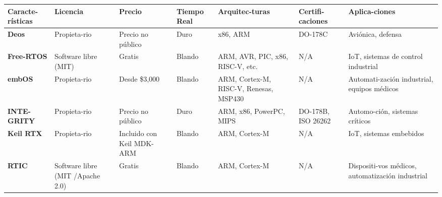 \begin{table}[]
\centering
\renewcommand{\arraystretch}{1.5}
\begin{tabularx}{\textwidth}{|X|X|X|X|X|X|X|}
\hline
\textbf{Caracte-rísticas}	&  \textbf{Licencia}						& \textbf{Precio}		 &  \textbf{Tiempo Real}	& \textbf{Arquitec-turas}			& \textbf{Certifi-caciones}	& \textbf{Aplica-ciones} \\ \hline
\textbf{Deos}			&  \cellcolor{red!33}Propieta-rio				& Precio no público		 &  Duro			& x86, ARM					& DO-178C			& Aviónica, defensa \\ \hline
\textbf{Free-RTOS}		&  \cellcolor{green!33}Software libre (MIT)			& Gratis			 &  Blando			& ARM, AVR, PIC, x86, RISC-V, etc.		& N/A				& IoT, sistemas de control industrial \\ \hline
\textbf{embOS}			&  \cellcolor{red!33}Propieta-rio				& Desde \$3,000			 &  Blando			& ARM, Cortex-M, RISC-V, Renesas, MSP430	& N/A				& Automati-zación industrial, equipos médicos \\ \hline
\textbf{INTE-GRITY}		&  \cellcolor{red!33}Propieta-rio				& Precio no público		 &  Duro			& ARM, x86, PowerPC, MIPS			& DO-178B, ISO 26262		& Automo-ción, sistemas críticos \\ \hline
\textbf{Keil RTX}		&  \cellcolor{red!33}Propieta-rio				& Incluido con Keil MDK-ARM	 &  Blando			& ARM, Cortex-M					& N/A				& IoT, sistemas embebidos \\ \hline
\textbf{RTIC}			&  \cellcolor{green!33}Software libre (MIT /Apache 2.0)		& Gratis			 &  Blando			& ARM, Cortex-M					& N/A				& Dispositi-vos médicos, automatización industrial \\ \hline
\end{tabularx}
\end{table}


